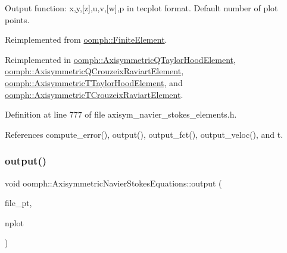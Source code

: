 Output function\+: x,y,\mbox{[}z\mbox{]},u,v,\mbox{[}w\mbox{]},p in tecplot format. Default number of plot points. 



Reimplemented from \hyperlink{classoomph_1_1FiniteElement_a72cddd09f8ddbee1a20a1ff404c6943e}{oomph\+::\+Finite\+Element}.



Reimplemented in \hyperlink{classoomph_1_1AxisymmetricQTaylorHoodElement_a91861ce04f934aeae956c9d938ce337f}{oomph\+::\+Axisymmetric\+Q\+Taylor\+Hood\+Element}, \hyperlink{classoomph_1_1AxisymmetricQCrouzeixRaviartElement_a89e6624edb01f732c6c10b068227de54}{oomph\+::\+Axisymmetric\+Q\+Crouzeix\+Raviart\+Element}, \hyperlink{classoomph_1_1AxisymmetricTTaylorHoodElement_a0b1f01968fd84b28009339e5e478a683}{oomph\+::\+Axisymmetric\+T\+Taylor\+Hood\+Element}, and \hyperlink{classoomph_1_1AxisymmetricTCrouzeixRaviartElement_ad5cb068224ac067b234de78e67866bb6}{oomph\+::\+Axisymmetric\+T\+Crouzeix\+Raviart\+Element}.



Definition at line 777 of file axisym\+\_\+navier\+\_\+stokes\+\_\+elements.\+h.



References compute\+\_\+error(), output(), output\+\_\+fct(), output\+\_\+veloc(), and t.

\mbox{\label{classoomph_1_1AxisymmetricNavierStokesEquations_abc2ca00250845e243da3f4e0845b2c96}} 
\subsubsection{\texorpdfstring{output()}{output()}\hspace{0.1cm}{\footnotesize\ttfamily [4/4]}}
{\footnotesize\ttfamily void oomph\+::\+Axisymmetric\+Navier\+Stokes\+Equations\+::output (\begin{DoxyParamCaption}\item[{F\+I\+LE $\ast$}]{file\+\_\+pt,  }\item[{const unsigned \&}]{nplot }\end{DoxyParamCaption})\hspace{0.3cm}{\ttfamily [virtual]}}



